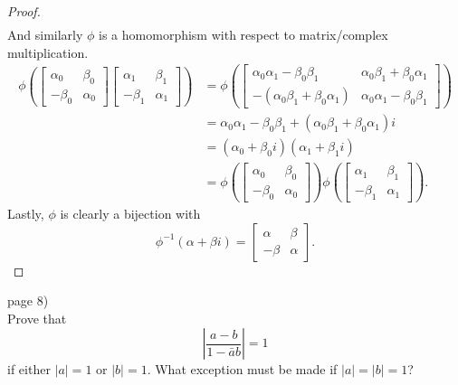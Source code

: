 \documentclass{article}
\newenvironment{problem}[2][Problem]{\begin{trivlist}
\item[\hskip \labelsep {\bfseries #1}\hskip \labelsep {\bfseries #2.}]}{\end{trivlist}}
\begin{document}
\begin{proof}
\begin{align*}
  \end{align*} And similarly $\phi$ is a homomorphism with respect to
  matrix/complex multiplication. \begin{align*}
    \phi\left(\begin{bmatrix}
      \alpha_0 & \beta_0 \\
      -\beta_0  & \alpha_0
    \end{bmatrix} \begin{bmatrix}
      \alpha_1 & \beta_1 \\
      -\beta_1  & \alpha_1
    \end{bmatrix}\right)
    &= \phi\left(\begin{bmatrix}
      \alpha_0\alpha_1-\beta_0\beta_1 & \alpha_0\beta_1 + \beta_0\alpha_1 \\
      -(\alpha_0\beta_1 + \beta_0\alpha_1)  & \alpha_0\alpha_1-\beta_0\beta_1
    \end{bmatrix}\right)\\
    &= \alpha_0\alpha_1 - \beta_0\beta_1 + (\alpha_0\beta_1 + \beta_0\alpha_1)i\\
    &= (\alpha_0 + \beta_0i)(\alpha_1 + \beta_1i)\\
    &= \phi\left(\begin{bmatrix}
      \alpha_0 & \beta_0 \\
      -\beta_0  & \alpha_0
    \end{bmatrix}\right)\phi\left(\begin{bmatrix}
      \alpha_1 & \beta_1 \\
      -\beta_1  & \alpha_1
    \end{bmatrix}\right).
  \end{align*}
  Lastly, $\phi$ is clearly a bijection with \[
    \phi^{-1}(\alpha + \beta i) = \begin{bmatrix}
      \alpha & \beta \\
      -\beta  & \alpha
    \end{bmatrix}.
  \]
\end{proof}

\pagebreak

\begin{problem}{3} (page 8) \\
  Prove that \[
    \left|\frac{a - b}{1 - \bar{a}b}\right| = 1
  \] if either $|a| = 1$ or $|b| = 1$.
  What exception must be made if $|a| = |b| = 1$?
\end{problem}
\end{document}
